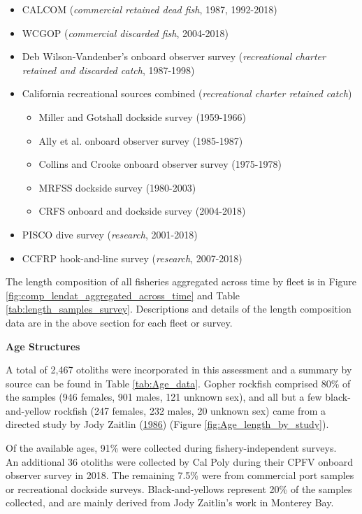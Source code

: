 \documentclass[12pt,]{article}
\begin{document}
\begin{itemize}[noitemsep,nolistsep,topsep=0pt]
  \item CALCOM (\emph{commercial retained dead fish}, 1987, 1992-2018)   
  \item WCGOP (\emph{commercial discarded fish}, 2004-2018)    
  \item Deb Wilson-Vandenber's onboard observer survey (\emph{recreational charter retained and discarded catch}, 1987-1998)
  \item California recreational sources combined (\emph{recreational charter retained catch})     
    \begin{itemize}[noitemsep,nolistsep]
      \item Miller and Gotshall dockside survey (1959-1966)    
      \item Ally  et al. onboard observer survey (1985-1987)
      \item Collins and Crooke onboard observer survey (1975-1978)     
      \item MRFSS dockside survey (1980-2003)     
      \item CRFS onboard and dockside survey (2004-2018)
    \end{itemize}
 \item PISCO dive survey (\emph{research}, 2001-2018)      
 \item CCFRP hook-and-line survey (\emph{research}, 2007-2018)        
\end{itemize}

The length composition of all fisheries aggregated across time by fleet
is in Figure \ref{fig:comp_lendat_aggregated_across_time} and Table
\ref{tab:length_samples_survey}. Descriptions and details of the length
composition data are in the above section for each fleet or survey.

\vspace{.5cm} \textbf{Age Structures}

A total of 2,467 otoliths were incorporated in this assessment and a
summary by source can be found in Table \ref{tab:Age_data}. Gopher
rockfish comprised 80\% of the samples (946 females, 901 males, 121
unknown sex), and all but a few black-and-yellow rockfish (247 females,
232 males, 20 unknown sex) came from a directed study by Jody Zaitlin
(\protect\hyperlink{ref-Zaitlin1986}{1986}) (Figure
\ref{fig:Age_length_by_study}).

Of the available ages, 91\% were collected during fishery-independent
surveys.\\
An additional 36 otoliths were collected by Cal Poly during their CPFV
onboard observer survey in 2018. The remaining 7.5\% were from
commercial port samples or recreational dockside surveys.
Black-and-yellows represent 20\% of the samples collected, and are
mainly derived from Jody Zaitlin's work in Monterey Bay.
\end{document}
